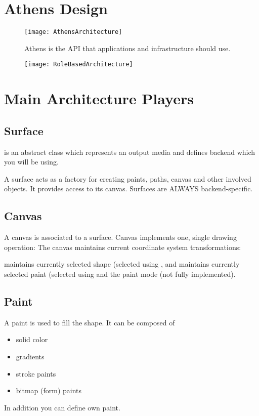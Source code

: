 \documentclass[a4paper,10pt,twoside]{book}
\begin{document}
\section{Athens Design}


\begin{figure}[!h]
\begin{center}
\texttt{[image: AthensArchitecture]}
\caption{ Athens is the API that applications and infrastructure should use. \label{fig:AthensArchitecture}}
\end{center}
\end{figure}

\begin{figure}[!h]
\begin{center}
\texttt{[image: RoleBasedArchitecture]}
\caption{ \label{fig:RoleBasedArchitecture}}
\end{center}
\end{figure}

\section{Main Architecture Players}

\subsection{Surface}
 is an abstract class which represents an output media and defines backend which you will be using.

A surface acts as a factory for creating paints, paths, canvas and other involved objects. 
It provides access to its canvas. Surfaces are ALWAYS backend-specific. 


\subsection{Canvas}
A canvas is associated to a surface. Canvas implements one, single drawing operation:   
The canvas maintains current coordinate system transformations:

 maintains currently selected shape (selected using , and 
maintains currently selected paint (selected using  and the paint mode (not fully implemented). 

\subsection{Paint}
A paint is used to fill the shape. It can be composed of 
\begin{itemize}
\item solid color
\item  gradients
\item  stroke paints
\item bitmap (form) paints
\end{itemize}
In addition you can define own paint. 
\end{document}
